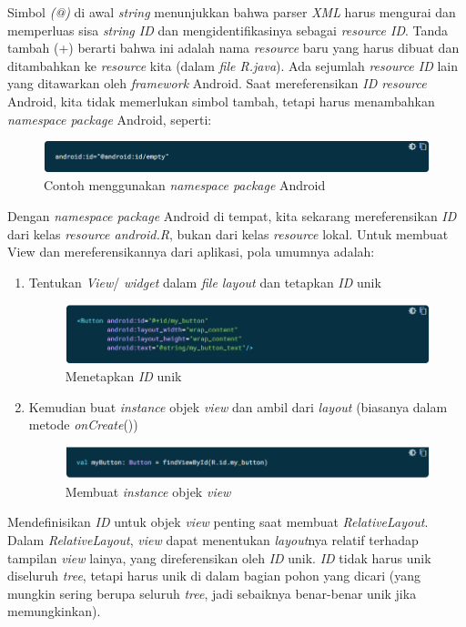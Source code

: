 Simbol \textit{(@)} di awal \textit{string} menunjukkan bahwa parser \textit{XML} harus mengurai dan memperluas sisa \textit{string ID} dan mengidentifikasinya sebagai \textit{resource ID}. Tanda tambah (+) berarti bahwa ini adalah nama \textit{resource} baru yang harus dibuat dan ditambahkan ke \textit{resource} kita (dalam \textit{file R.java}). Ada sejumlah \textit{resource ID} lain yang ditawarkan oleh \textit{framework} Android. Saat mereferensikan \textit{ID resource} Android, kita tidak memerlukan simbol tambah, tetapi harus menambahkan \textit{namespace package} Android, seperti:
\begin{figure}[H]
	\centering
	\includegraphics[keepaspectratio, width=12cm]{gambar/layout_tagidbutton2}
	\caption{Contoh menggunakan \textit{namespace package} Android \citep{developerandroid}}
	\label{gambar:gambar_46}
\end{figure}
Dengan \textit{namespace package} Android di tempat, kita sekarang mereferensikan \textit{ID} dari kelas \textit{resource android.R}, bukan dari kelas \textit{resource} lokal.
Untuk membuat View dan mereferensikannya dari aplikasi, pola umumnya adalah:
\begin{enumerate}
\item Tentukan \textit{View}/ \textit{widget} dalam \textit{file layout} dan tetapkan \textit{ID} unik
\begin{figure}[H]
	\centering
	\includegraphics[keepaspectratio, width=12cm]{gambar/layout_view1}
	\caption{Menetapkan \textit{ID} unik \citep{developerandroid}}
	\label{gambar:gambar_47}
\end{figure}
\item Kemudian buat \textit{instance} objek \textit{view} dan ambil dari \textit{layout} (biasanya dalam metode \textit{onCreate}())
\begin{figure}[H]
	\centering
	\includegraphics[keepaspectratio, width=12cm]{gambar/layout_view2}
	\caption{Membuat \textit{instance} objek \textit{view} \citep{developerandroid}}
	\label{gambar:gambar_48}
\end{figure}
\end{enumerate}
Mendefinisikan \textit{ID} untuk objek \textit{view} penting saat membuat \textit{RelativeLayout}. Dalam \textit{RelativeLayout}, \textit{view} dapat menentukan \textit{layout}nya relatif terhadap tampilan \textit{view} lainya, yang direferensikan oleh \textit{ID} unik. \textit{ID} tidak harus unik diseluruh \textit{tree}, tetapi harus unik di dalam bagian pohon yang dicari (yang mungkin sering berupa seluruh \textit{tree}, jadi sebaiknya benar-benar unik jika memungkinkan).

